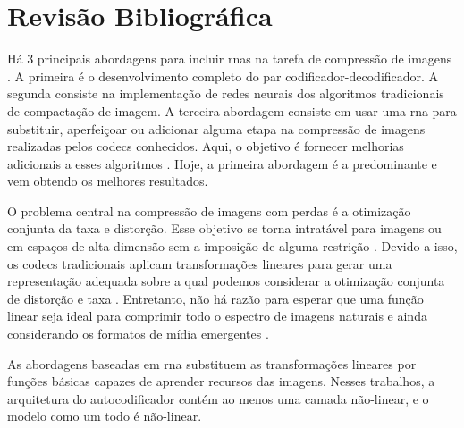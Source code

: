 \chapter{Revisão Bibliográfica}



Há 3 principais abordagens para incluir \acrshort{rna}s na tarefa de compressão de imagens \cite{Jiang1999}. A primeira é o desenvolvimento completo do par codificador-decodificador. A segunda consiste na implementação de redes neurais dos algoritmos tradicionais de compactação de imagem. A terceira abordagem consiste em usar uma \acrshort{rna} para substituir, aperfeiçoar ou adicionar alguma etapa na compressão de imagens realizadas pelos \acrshort{codec}s conhecidos. Aqui, o objetivo é fornecer melhorias adicionais a esses algoritmos \cite{Jiang1999}. Hoje, a primeira abordagem é a predominante e vem obtendo os melhores resultados.

O problema central na compressão de imagens com perdas é a otimização conjunta da taxa e distorção. Esse objetivo se torna intratável para imagens ou em espaços de alta dimensão sem a imposição de alguma restrição \cite{gersho2012vector}. Devido a isso, os \acrshort{codec}s tradicionais aplicam transformações lineares para gerar uma representação adequada sobre a qual podemos considerar a otimização conjunta de distorção e taxa \cite{End2016Balle}. Entretanto, não há razão para esperar que uma função linear seja ideal para comprimir todo o espectro de imagens naturais e ainda considerando os formatos de mídia emergentes \cite{santurkar2018generative}.  

As abordagens baseadas em \acrshort{rna} \cite{Variable2016Toderici,Priming2017Johnston,target,Priming2017Johnston,FullResolution2017Toderici,End2016Balle,Autoregressive2018Minnen,Lossy2017Theis,Variational2018Balle,zhao1901cae,akbari2019dsslic} substituem as transformações lineares por funções básicas capazes de aprender recursos das imagens. Nesses trabalhos, a arquitetura do autocodificador contém ao menos uma camada não-linear, e o modelo como um todo é não-linear.   



